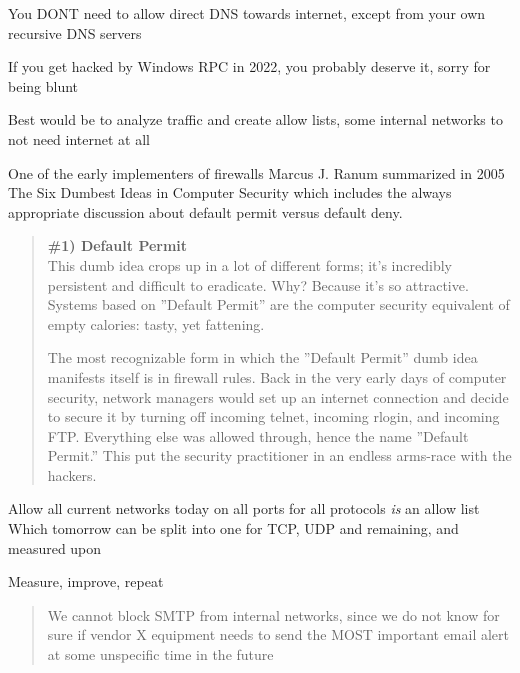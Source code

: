 \documentclass[Screen16to9,17pt]{foils}
\begin{document}
You DONT need to allow direct DNS towards internet, except from your own recursive DNS servers

If you get hacked by Windows RPC in 2022, you probably deserve it, sorry for being blunt

Best would be to analyze traffic and create allow lists, some internal networks to not need internet at all




One of the early implementers of firewalls Marcus J. Ranum summarized in 2005 The Six Dumbest Ideas in Computer Security  which includes the always appropriate discussion about default permit versus default deny.

\begin{quote}\small {\bf
\#1) Default Permit}\\
This dumb idea crops up in a lot of different forms; it’s incredibly persistent and difficult to eradicate. Why? Because it’s so attractive. Systems based on ”Default Permit” are the computer security equivalent of empty calories: tasty, yet fattening.

The most recognizable form in which the ”Default Permit” dumb idea manifests itself is in firewall rules. Back in the very early days of computer security, network managers would set up an internet connection and decide to secure it by turning off incoming telnet, incoming rlogin, and incoming FTP. Everything else was allowed through, hence the name ”Default Permit.” This put the security practitioner in an endless arms-race with the hackers.
\end{quote}


\begin{list2}
\item Allow all current networks today on all ports for all protocols \emph{is} an allow list \\
Which tomorrow can be split into one for TCP, UDP and remaining, and measured upon
\item Measure, improve, repeat
\end{list2}




\begin{quote}
We cannot block SMTP from internal networks, since we do not know for sure if vendor X equipment needs to send the MOST important email alert at some unspecific time in the future
\end{quote}
\end{document}
